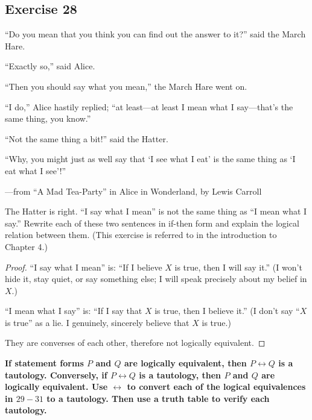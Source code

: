 \documentclass[14pt]{extarticle}
\newcommand{\bic}{\leftrightarrow}
\begin{document}
\subsection{Exercise 28} 
“Do you mean that you think you can find out the answer to it?” said the March Hare.

“Exactly so,” said Alice.

“Then you should say what you mean,” the March Hare went on.

“I do,” Alice hastily replied; “at least—at least I mean what I say—that’s the same thing, you know.”

“Not the same thing a bit!” said the Hatter.

“Why, you might just as well say that ‘I see what I eat’ is the same thing as ‘I eat what I see’!”

—from “A Mad Tea-Party” in Alice in Wonderland, by Lewis Carroll

The Hatter is right. “I say what I mean” is not the same thing as “I mean what I say.” Rewrite each of these two sentences in if-then form and explain the logical relation between them. (This exercise is referred to in the introduction to Chapter 4.)

\begin{proof}
“I say what I mean” is: ``If I believe $X$ is true, then I will
say it.'' (I won't hide it, stay quiet, or say something else; I will speak precisely about my belief in $X$.)

“I mean what I say” is: ``If I say that $X$ is true, then I believe it.'' (I don't say ``$X$ is true'' as a lie. I genuinely, sincerely believe that $X$ is true.)

They are converses of each other, therefore not logically equivalent.
\end{proof}

{\bf If statement forms $P$ and $Q$ are logically equivalent, then $P \bic Q$ is a tautology. Conversely, if $P \bic Q$ is a tautology, then $P$ and $Q$ are logically equivalent. Use $\bic$ to convert each of the logical equivalences in $29-31$ to a tautology. Then use a truth table to verify each tautology.}
\end{document}
